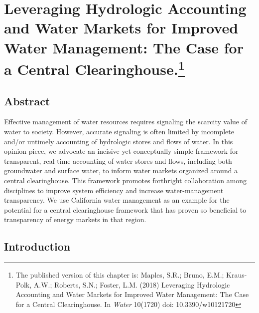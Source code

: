 \chapter[Leveraging Hydrologic Accounting and Water Markets for Improved Water Management: The Case for a Central Clearinghouse]{Leveraging Hydrologic Accounting and Water Markets for Improved Water Management: The Case for a Central Clearinghouse.\footnote[1]{The published version of this chapter is: Maples, S.R.; Bruno, E.M.; Kraus-Polk, A.W.; Roberts, S.N.; Foster, L.M. (2018) Leveraging Hydrologic Accounting and Water Markets for Improved Water Management: The Case for a Central Clearinghouse. In \textit{Water} 10(1720) doi: 10.3390/w10121720}}

\section{Abstract}

\noindent Effective management of water resources requires signaling the scarcity value of water to society. However, accurate signaling is often limited by incomplete and/or untimely accounting of hydrologic stores and flows of water. In this opinion piece, we advocate an incisive yet conceptually simple framework for transparent, real-time accounting of water stores and flows, including both groundwater and surface water, to inform water markets organized around a central clearinghouse. This framework promotes forthright collaboration among disciplines to improve system efficiency and increase water-management transparency. We use California water management as an example for the potential for a central clearinghouse framework that has proven so beneficial to transparency of energy markets in that region.

\section{Introduction}

